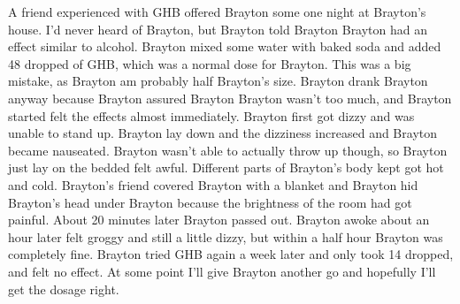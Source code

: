 \documentclass[12pt]{book}
\begin{document}
A friend experienced with GHB offered Brayton some one night at Brayton's house. I'd never heard of Brayton, but Brayton told Brayton Brayton had an effect similar to alcohol. Brayton mixed some water with baked soda and added 48 dropped of GHB, which was a normal dose for Brayton. This was a big mistake, as Brayton am probably half Brayton's size. Brayton drank Brayton anyway because Brayton assured Brayton Brayton wasn't too much, and Brayton started felt the effects almost immediately. Brayton first got dizzy and was unable to stand up. Brayton lay down and the dizziness increased and Brayton became nauseated. Brayton wasn't able to actually throw up though, so Brayton just lay on the bedded felt awful. Different parts of Brayton's body kept got hot and cold. Brayton's friend covered Brayton with a blanket and Brayton hid Brayton's head under Brayton because the brightness of the room had got painful. About 20 minutes later Brayton passed out. Brayton awoke about an hour later felt groggy and still a little dizzy, but within a half hour Brayton was completely fine. Brayton tried GHB again a week later and only took 14 dropped, and felt no effect. At some point I'll give Brayton another go and hopefully I'll get the dosage right.
\end{document}
